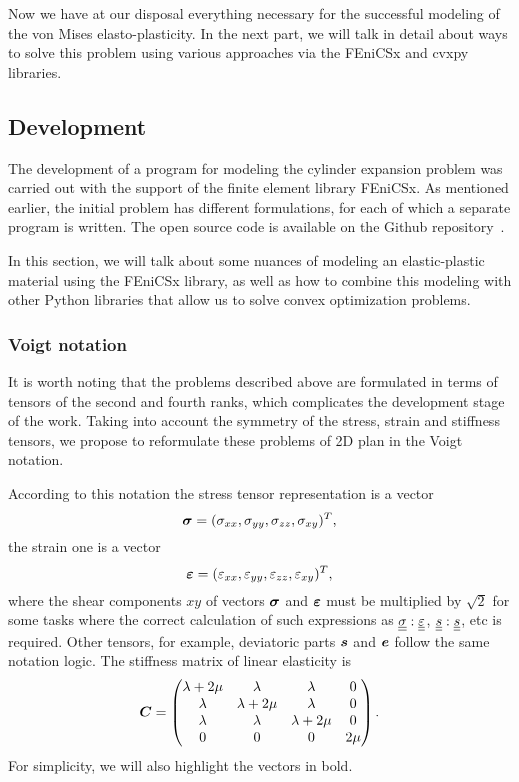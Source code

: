 \documentclass[12pt]{article}
\begin{document}
Now we have at our disposal everything necessary for the successful modeling of the von Mises elasto-plasticity. In the next part, we will talk in detail about ways to solve this problem using various approaches via the FEniCSx and cvxpy libraries.

\subsection{Development}

The development of a program for modeling the cylinder expansion problem was carried out with the support of the finite element library FEniCSx. As mentioned earlier, the initial problem has different formulations, for each of which a separate program is written. The open source code is available on the Github repository~\cite{convex-plasticity}. 

In this section, we will talk about some nuances of modeling an elastic-plastic material using the FEniCSx library, as well as how to combine this modeling with other Python libraries that allow us to solve convex optimization problems.

\subsubsection{Voigt notation}

It is worth noting that the problems described above are formulated in terms of tensors of the second and fourth ranks, which complicates the development stage of the work. Taking into account the symmetry of the stress, strain and stiffness tensors, we propose to reformulate these problems of 2D plan in the Voigt notation.

According to this notation the stress tensor representation is a vector
\begin{equation*}
    \mbox{\boldmath$\sigma$} = (\sigma_{xx}, \sigma_{yy}, \sigma_{zz}, \sigma_{xy})^T,  
\end{equation*}
the strain one is a vector
\begin{equation*}
    \mbox{\boldmath $\varepsilon$} = (\varepsilon_{xx}, \varepsilon_{yy}, \varepsilon_{zz}, \varepsilon_{xy})^T,
\end{equation*}
where the shear components $xy$ of vectors $\mbox{\boldmath$\sigma$}$ and $\mbox{\boldmath $\varepsilon$}$ must be multiplied by $\sqrt{2}$ for some tasks where the correct calculation of such expressions as $\underline{\underline{\sigma}}:\underline{\underline{\varepsilon}}$, $\underline{\underline{s}}:\underline{\underline{s}}$, etc is required. Other tensors, for example, deviatoric parts $\mbox{\boldmath $s$}$ and $\mbox{\boldmath $e$}$ follow the same notation logic. The stiffness matrix of linear elasticity is 
\begin{equation*}
    \mbox{\boldmath $C$} = 
    \begin{pmatrix}
        \lambda + 2\mu & \lambda & \lambda & 0 \\
        \lambda & \lambda + 2\mu & \lambda & 0 \\
        \lambda & \lambda & \lambda + 2\mu & 0 \\
        0 & 0 & 0 & 2\mu 
    \end{pmatrix}.
\end{equation*}
For simplicity, we will also highlight the vectors in bold.
\end{document}
